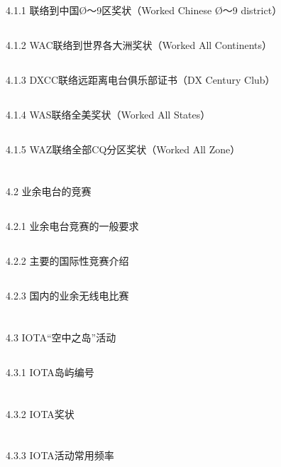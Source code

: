 \documentclass[12pt,UTF8]{ctexbook}
\begin{document}
\subsection{}4.1.1 联络到中国Ø～9区奖状（Worked Chinese Ø～9 district）
\subsection{}4.1.2 WAC联络到世界各大洲奖状（Worked All Continents）
\subsection{}4.1.3 DXCC联络远距离电台俱乐部证书（DX Century Club）
\subsection{}4.1.4 WAS联络全美奖状（Worked All States）
\subsection{}4.1.5 WAZ联络全部CQ分区奖状（Worked All Zone）
\section{}4.2 业余电台的竞赛
\subsection{}4.2.1 业余电台竞赛的一般要求
\subsection{}4.2.2 主要的国际性竞赛介绍
\subsection{}4.2.3 国内的业余无线电比赛
\section{}4.3 IOTA“空中之岛”活动
\subsection{}4.3.1 IOTA岛屿编号
\section{}4.3.2 IOTA奖状
\section{}4.3.3 IOTA活动常用频率
\end{document}
